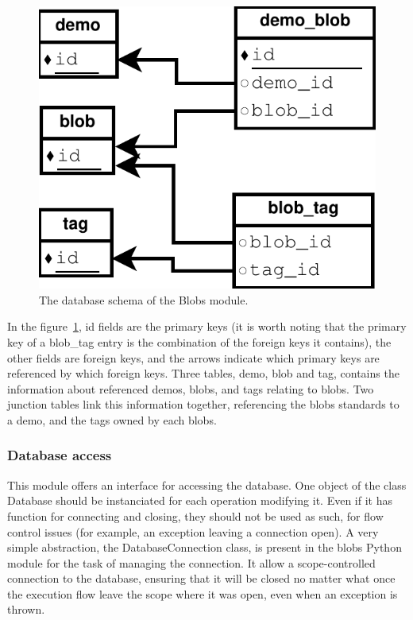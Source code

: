 \begin{figure}[h]
\centering
\includegraphics[scale=0.75]{blobs/images/blobs_database.pdf}
\caption{The database schema of the Blobs module.}
\label{fig:blobs_database}
\end{figure}

In the figure~\ref{fig:blobs_database}, id fields are the primary keys (it is worth noting that the primary key of a blob\_tag entry is the combination of the foreign keys it contains), the other fields are foreign keys, and the arrows indicate which primary keys are referenced by which foreign keys.
Three tables, demo, blob and tag, contains the information about referenced demos, blobs, and tags relating to blobs. Two junction tables link this information together, referencing the blobs standards to a demo, and the tags owned by each blobs.

\subsubsection{Database access}
This module offers an interface for accessing the database. One object of the class Database should be instanciated for each operation modifying it. Even if it has function for connecting and closing, they should not be used as such, for flow control issues (for example, an exception leaving a connection open). A very simple abstraction, the DatabaseConnection class, is present in the blobs Python module for the task of managing the connection. It allow a scope-controlled connection to the database, ensuring that it will be closed no matter what once the execution flow leave the scope where it was open, even when an exception is thrown.

